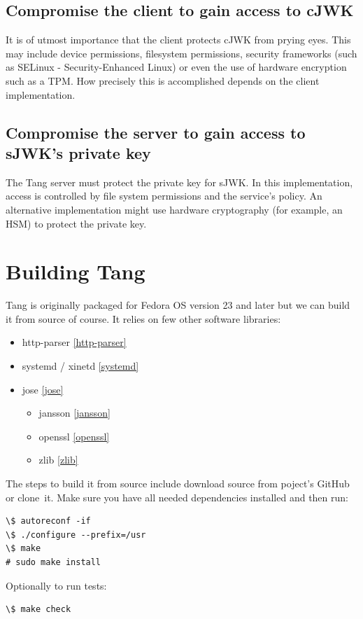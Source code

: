 \subsection{Compromise the client to gain access to cJWK}
It is of utmost importance that the client protects cJWK from prying eyes.
This may include device permissions, filesystem permissions, security frameworks (such as SELinux - Security-Enhanced Linux) or even the use of hardware encryption such as a TPM.
How precisely this is accomplished depends on the client implementation.
\subsection{Compromise the server to gain access to sJWK's private key}
The Tang server must protect the private key for sJWK.
In this implementation, access is controlled by file system permissions and the service's policy.
An alternative implementation might use hardware cryptography (for example, an HSM) to protect the private key.
\section{Building Tang}

Tang is originally packaged for Fedora OS version 23 and later but we can build it from source of course.
It relies on few other software libraries:
\label{dependencies}
\begin{itemize}
\item http-parser \ref{http-parser}
\item systemd / xinetd \ref{systemd}
\item jose \ref{jose}
    \begin{itemize}
    \item jansson \ref{jansson}
    \item openssl \ref{openssl}
    \item zlib \ref{zlib}
    \end{itemize}
\end{itemize}

The steps to build it from source include download source from poject's GitHub or clone~it.
Make sure you have all needed dependencies installed and then run:
\begin{lstlisting}[columns=fixed,tabsize=4,backgroundcolor=\color{yellow!10}]
\$ autoreconf -if
\$ ./configure --prefix=/usr
\$ make
# sudo make install
\end{lstlisting}
Optionally to run tests:
\begin{lstlisting}[columns=fixed,tabsize=4,backgroundcolor=\color{yellow!10}]
\$ make check
\end{lstlisting}
